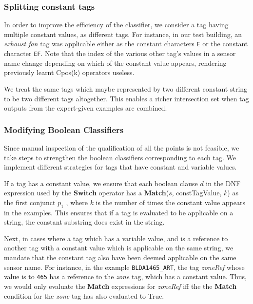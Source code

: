 \subsubsection{Splitting constant tags}

In order to improve the efficiency of the classifier, we consider a tag having multiple constant values, as different tags. For instance, in our test building, an {\it exhaust fan} tag was applicable either as the constant characters \texttt{E} or the constant character \texttt{EF}. Note that the index of the various other tag's values in a sensor name change depending on which of the constant value appears, rendering previously learnt Cpos(k) operators useless. 

We treat the same tags which maybe represented by two different constant string to be two different tags altogether. This enables a richer intersection set when tag outputs from the expert-given examples are combined. 

\subsubsection{Modifying Boolean Classifiers}

Since manual inspection of the qualification of all the points is not feasible, we take steps to strengthen the boolean classifiers corresponding to each tag. We implement different strategies for tags that have constant and variable values.

If a tag has a constant value, we ensure that each boolean clause $d$ in the DNF expression used by the {\bf Switch} operator has a {\bf Match}($s$, constTagValue, $k$) as the first conjunct $p_1$ , where $k$ is the number of times the constant value appears in the examples. This ensures that if a tag is evaluated to be applicable on a string, the constant substring does exist in the string.

Next, in cases where a tag which has a variable value, and is a reference to another tag with a constant value which is applicable on the same string, we mandate that the constant tag also have been deemed applicable on the same sensor name. For instance, in the example \texttt{BLDA1465\_ART}, the tag {\it zoneRef} whose value is to \texttt{465} has a reference to the {\it zone} tag, which has a constant value. Thus, we would only evaluate the {\bf Match} expressions for {\it zoneRef} iff the the {\bf Match} condition for the {\it zone} tag has also evaluated to True. \\




